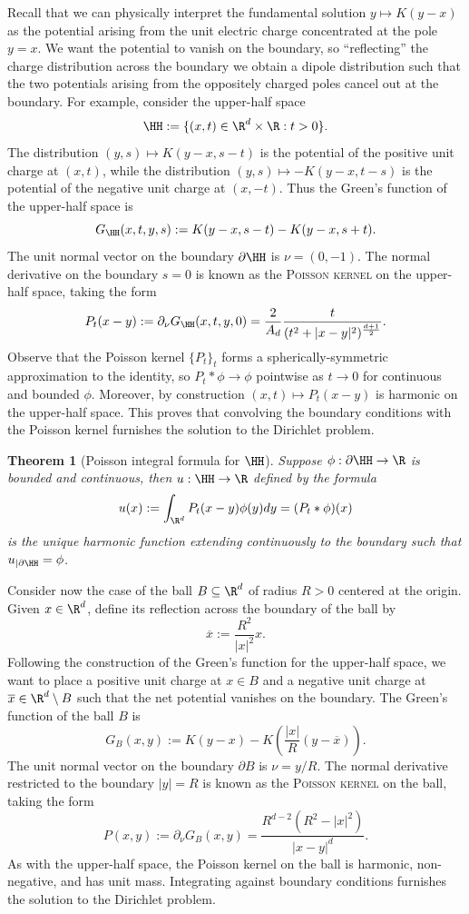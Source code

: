 \documentclass[reqno]{amsart}
\newtheorem{theorem}{Theorem}
\theoremstyle{definition}
\theoremstyle{remark}
\newcounter{problem}[section]	\declaretheorem[style=thmrecbox,name=Problem, numberlike=problem]{statement}
\renewcommand{\emph}{\textsc}
\begin{document}
Recall that we can physically interpret the fundamental solution $y \mapsto K(y - x)$ as the potential arising from the unit electric charge concentrated at the pole $y = x$. We want the potential to vanish on the boundary, so ``reflecting'' the charge distribution across the boundary we obtain a dipole distribution such that the two potentials arising from the oppositely charged poles cancel out at the boundary. For example, consider the upper-half space 
	\[ \HH := \{ (x, t) \in \R^d \times \R : t > 0 \}. \]
The distribution $(y, s) \mapsto K(y - x, s - t)$ is the potential of the positive unit charge at $(x, t)$, while the distribution $(y, s) \mapsto -K(y - x, t - s)$ is the potential of the negative unit charge at $(x, -t)$. Thus the Green's function of the upper-half space is 
	\[ G_\HH (x, t, y, s) := K(y - x, s - t) - K(y - x, s + t). \]
The unit normal vector on the boundary $\partial \HH$ is $\nu = (0, -1)$. The normal derivative on the boundary $s = 0$ is known as the \emph{Poisson kernel} on the upper-half space, taking the form
	\[ P_t (x - y) := \partial_\nu G_\HH (x, t, y, 0) = \frac{2}{A_d} \frac{t}{(t^2 + |x - y|^2)^{\frac{d + 1}{2}}}. \]
Observe that the Poisson kernel $\{P_t\}_t$ forms a spherically-symmetric approximation to the identity, so $P_t * \phi \to \phi$ pointwise as $t \to 0$ for continuous and bounded $\phi$. Moreover, by construction $(x, t) \mapsto P_t (x - y)$ is harmonic on the upper-half space. This proves that convolving the boundary conditions with the Poisson kernel furnishes the solution to the Dirichlet problem. 
	

\begin{theorem}[Poisson integral formula for $\HH$]
	Suppose $\phi : \partial \HH \to \R$ is bounded and continuous, then $u : \HH \to \R$ defined by the formula
		\[ u(x) := \int_{\R^d} P_t (x - y) \phi(y) d y = (P_t * \phi)(x) \]
	is the unique harmonic function extending continuously to the boundary such that $u_{|\partial \HH} = \phi$. 
\end{theorem}

Consider now the case of the ball $B \subseteq \R^d$ of radius $R > 0$ centered at the origin. Given $x \in \R^d$, define its reflection across the boundary of the ball by 
	\[ \overline x := \frac{R^2}{|x|^2} x. \]
Following the construction of the Green's function for the upper-half space, we want to place a positive unit charge at $x \in B$ and a negative unit charge at $\overline x \in \R^d \setminus B$ such that the net potential vanishes on the boundary. The Green's function of the ball $B$ is
	\[ G_B (x, y) := K(y - x) - K\left( \frac{|x|}{R}(y - \overline x)\right). \]
The unit normal vector on the boundary $\partial B$ is $\nu = y/R$. The normal derivative restricted to the boundary $|y| = R$ is known as the \emph{Poisson kernel} on the ball, taking the form 
	\[ P (x, y) := \partial_\nu G_B (x, y) =\frac{R^{d - 2} (R^2 - |x|^2)}{|x - y|^d}.  \]
As with the upper-half space, the Poisson kernel on the ball is harmonic, non-negative, and has unit mass. Integrating against boundary conditions furnishes the solution to the Dirichlet problem. 
\end{document}
